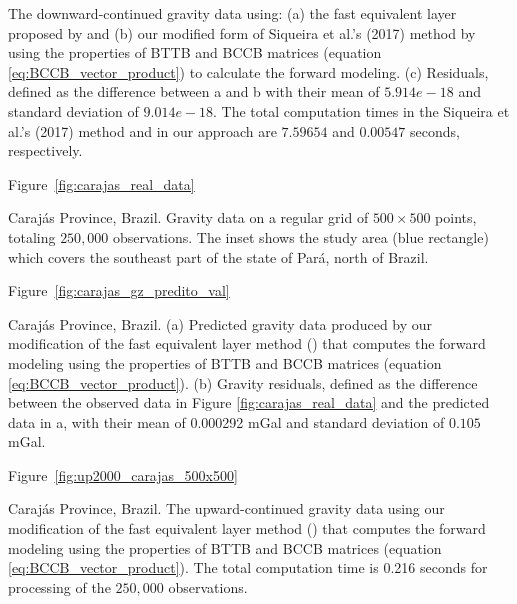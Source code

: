 \documentclass[paper]{geophysics}
\begin{document}
{The downward-continued gravity data using: (a) the fast equivalent layer proposed by \cite{siqueira2017fast} and (b) our modified form of Siqueira et al.'s (2017) method by using the properties of BTTB and BCCB matrices (equation \ref{eq:BCCB_vector_product}) to calculate the forward modeling.  (c) Residuals, defined as the difference between a and b with their mean of $5.914e-18$ and standard deviation of $9.014e-18$.  The total computation times in the Siqueira et al.'s (2017) method and in our approach are $7.59654$ and $0.00547$ seconds, respectively.}
\newpage

Figure~\ref{fig:carajas_real_data}

{Caraj\'as Province, Brazil. Gravity data on a regular grid of $500 \times 500$ points, totaling $250,000$ observations. The inset shows the study area (blue rectangle) which covers the southeast part of the state of Par\'a, north of Brazil.}
\newpage

Figure~\ref{fig:carajas_gz_predito_val}

{Caraj\'as Province, Brazil. (a) Predicted gravity data produced by our modification of the fast equivalent layer method (\cite{siqueira2017fast})  that computes the forward modeling using the properties of BTTB and BCCB matrices (equation \ref{eq:BCCB_vector_product}). (b) Gravity residuals, defined as the difference between the observed data in Figure \ref{fig:carajas_real_data} and the predicted data in a, with their mean of 0.000292 mGal and standard deviation of $0.105$ mGal.}
\newpage

Figure~\ref{fig:up2000_carajas_500x500}

{Caraj\'as Province, Brazil. The upward-continued gravity data using our modification of the fast equivalent layer method (\cite{siqueira2017fast}) that computes the forward modeling using the properties of BTTB and BCCB matrices (equation \ref{eq:BCCB_vector_product}). The total computation time is 0.216 seconds for processing of the $250,000$ observations.}
\newpage

%
%
\end{document}
